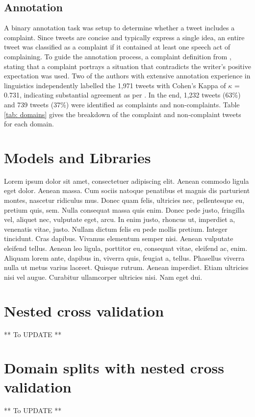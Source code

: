 \subsection{Annotation}
A binary annotation task was setup to determine whether a tweet includes a complaint. Since tweets are concise and typically express a single idea, an entire tweet was classified as a complaint if it contained at least one speech act of complaining. To guide the annotation process, a complaint definition from \cite{olshtain_speechact_1987}, stating that a complaint portrays a situation that contradicts the writer's positive expectation was used. Two of the authors with extensive annotation experience in linguistics independently labelled the 1,971 tweets with Cohen's Kappa of $\kappa$ = 0.731, indicating substantial agreement as per \cite{artsteinInterCoderAgreementComputational2008}. In the end, 1,232 tweets (63\%) and 739 tweets (37\%) were identified as complaints and non-complaints. Table \ref{tab: domains} gives the breakdown of the complaint and non-complaint tweets for each domain.




\section{Models and Libraries}

Lorem ipsum dolor sit amet, consectetuer adipiscing elit. Aenean commodo ligula eget dolor. Aenean massa. Cum sociis natoque penatibus et magnis dis parturient montes, nascetur ridiculus mus. Donec quam felis, ultricies nec, pellentesque eu, pretium quis, sem. Nulla consequat massa quis enim. Donec pede justo, fringilla vel, aliquet nec, vulputate eget, arcu. In enim justo, rhoncus ut, imperdiet a, venenatis vitae, justo. Nullam dictum felis eu pede mollis pretium. Integer tincidunt. Cras dapibus. Vivamus elementum semper nisi. Aenean vulputate eleifend tellus. Aenean leo ligula, porttitor eu, consequat vitae, eleifend ac, enim. Aliquam lorem ante, dapibus in, viverra quis, feugiat a, tellus. Phasellus viverra nulla ut metus varius laoreet. Quisque rutrum. Aenean imperdiet. Etiam ultricies nisi vel augue. Curabitur ullamcorper ultricies nisi. Nam eget dui. 

\section{Nested cross validation}
** To UPDATE **

\section{Domain splits with nested cross validation}
** To UPDATE **

